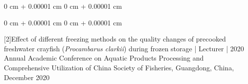 \documentclass[10pt, letterpaper]{article}
\newenvironment{highlights}{
    \begin{itemize}[
        topsep=0.10 cm,
        parsep=0.10 cm,
        partopsep=0pt,
        itemsep=0pt,
        leftmargin=0 cm + 10pt
    ]
}{
    \end{itemize}
} %
\newenvironment{onecolentry}{
    \begin{adjustwidth}{
        0 cm + 0.00001 cm
    }{
        0 cm + 0.00001 cm
    }
}{
    \end{adjustwidth}
} %
\newenvironment{twocolentry}[2][]{
    \onecolentry
    \def\secondColumn{#2}
    \setcolumnwidth{\fill, 4.5 cm}
    \begin{paracol}{2}
}{
    \switchcolumn \raggedleft \secondColumn
    \end{paracol}
    \endonecolentry
} %
\newenvironment{header}{
    \setlength{\topsep}{0pt}\par\kern\topsep\centering\linespread{1}
}{
    \par\kern\topsep
} %
\begin{document}
\begin{header}
\begin{onecolentry}
\end{onecolentry}
\begin{onecolentry}
    
[2]Effect of different freezing methods on the quality changes of precooked freshwater crayfish (\textit{Procambarus clarkii}) during frozen storage | Lecturer | 2020 Annual Academic Conference on Aquatic Products Processing and Comprehensive Utilization of China Society of Fisheries, Guangdong, China, December 2020 

\end{onecolentry}

    

     

    \section{}

    \begin{comment}
        
    

         \begin{twocolentry}{
            Apr.2025
        }
            \textbf{\textbf{Health promotion event: Food makeover- Healthier Swaps You'LL Love| Team work }
}\end{twocolentry}
\begin{onecolentry}
    Advisor: Professor Katherine Markwell, School of Food Science and Nutrition, UoL 

\end{onecolentry}
        \vspace{0.10 cm}
        \begin{onecolentry}
            \begin{highlights}
                \item Designed a pre-event feedback form to investigate the popular health topic among people, and then made the plan with SWOT analysis
                \item By showing the example of a meal deal, we taught people how to read nutrition label and food traffic lights on the package 
                \item A chocolate brownie and a healthier swap of banana brownie were both offered for people to taste and vote for their preference. A stick recycle box was used for voting to make it more interesting. 
                \item Recipes of some healthy food swap was given to people to have a try at home.
                \item An after-event feedback was filled out by people and being analyzed later to evaluate the effect of the event


\end{comment}
\end{header}
\end{document}
